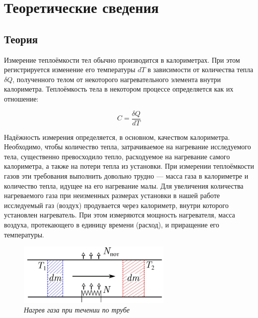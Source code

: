 \documentclass[a4paper,12pt]{article}
\begin{document}
\section{Теоретические сведения}

\subsection{Теория}

Измерение теплоёмкости тел обычно производится в калориметрах. При этом регистрируется изменение его температуры $ d T $ в зависимости от количества тепла $ \delta Q $, полученного телом от некоторого нагревательного элемента внутри калориметра. Теплоёмкость тела в некотором процессе определяется как их отношение:

\begin{equation}
    C = \frac{\delta Q}{ d T }
\end{equation}

Надёжность измерения определяется, в основном, качеством калориметра. Необходимо, чтобы количество тепла, затрачиваемое на нагревание исследуемого тела, существенно превосходило тепло, расходуемое на нагревание самого калориметра, а также на потери тепла из установки. При измерении теплоёмкости газов эти требования выполнить довольно трудно — масса газа в калориметре и количество тепла, идущее на его нагревание малы. Для увеличения количества нагреваемого газа при неизменных размерах установки в нашей работе исследуемый газ (воздух) продувается через калориметр, внутри которого установлен нагреватель. При этом измеряются мощность нагревателя, масса воздуха, протекающего в единицу времени (расход), и приращение его температуры.

\begin{figure}
    \centering
    \includegraphics[height=3cm]{nagrev.png}
    \caption{\textit{Нагрев газа при течении по трубе}}
    \label{fig:myfig1}
\end{figure}
\end{document}
